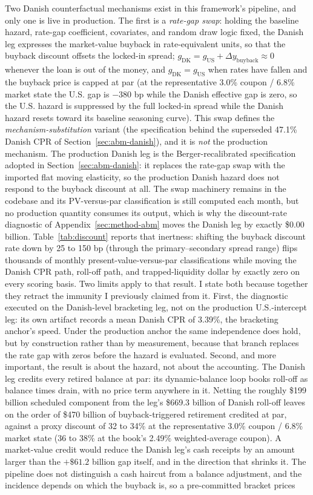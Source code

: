 \documentclass[12pt]{article}
\begin{document}
Two Danish counterfactual mechanisms exist in this framework's pipeline, and only one is live in production. The first is a \emph{rate-gap swap}: holding the baseline hazard, rate-gap coefficient, covariates, and random draw logic fixed, the Danish leg expresses the market-value buyback in rate-equivalent units, so that the buyback discount offsets the locked-in spread; $g_{\mathrm{DK}} = g_{\mathrm{US}} + \Delta y_{\mathrm{buyback}} \approx 0$ whenever the loan is out of the money, and $g_{\mathrm{DK}} = g_{\mathrm{US}}$ when rates have fallen and the buyback price is capped at par (at the representative 3.0\% coupon / 6.8\% market state the U.S. gap is $-380$ bp while the Danish effective gap is zero, so the U.S. hazard is suppressed by the full locked-in spread while the Danish hazard resets toward its baseline seasoning curve). This swap defines the \emph{mechanism-substitution} variant (the specification behind the superseded 47.1\% Danish CPR of Section~\ref{sec:abm-danish}), and it is \emph{not} the production mechanism. The production Danish leg is the Berger-recalibrated specification adopted in Section~\ref{sec:abm-danish}: it replaces the rate-gap swap with the imported flat moving elasticity, so the production Danish hazard does not respond to the buyback discount at all. The swap machinery remains in the codebase and its PV-versus-par classification is still computed each month, but no production quantity consumes its output, which is why the discount-rate diagnostic of Appendix~\ref{sec:method-abm} moves the Danish leg by exactly \$0.00 billion. Table~\ref{tab:discount} reports that inertness: shifting the buyback discount rate down by 25 to 150 bp (through the primary--secondary spread range) flips thousands of monthly present-value-versus-par classifications while moving the Danish CPR path, roll-off path, and trapped-liquidity dollar by exactly zero on every scoring basis. Two limits apply to that result. I state both because together they retract the immunity I previously claimed from it. First, the diagnostic executed on the Danish-level bracketing leg, not on the production U.S.-intercept leg: its own artifact records a mean Danish CPR of 3.39\%, the bracketing anchor's speed. Under the production anchor the same independence does hold, but by construction rather than by measurement, because that branch replaces the rate gap with zeros before the hazard is evaluated. Second, and more important, the result is about the hazard, not about the accounting. The Danish leg credits every retired balance at par: its dynamic-balance loop books roll-off as balance times drain, with no price term anywhere in it. Netting the roughly \$199 billion scheduled component from the leg's \$669.3 billion of Danish roll-off leaves on the order of \$470 billion of buyback-triggered retirement credited at par, against a proxy discount of 32 to 34\% at the representative 3.0\% coupon / 6.8\% market state (36 to 38\% at the book's 2.49\% weighted-average coupon). A market-value credit would reduce the Danish leg's cash receipts by an amount larger than the $+\$61.2$ billion gap itself, and in the direction that shrinks it. The pipeline does not distinguish a cash haircut from a balance adjustment, and the incidence depends on which the buyback is, so a pre-committed bracket prices 
\end{document}
